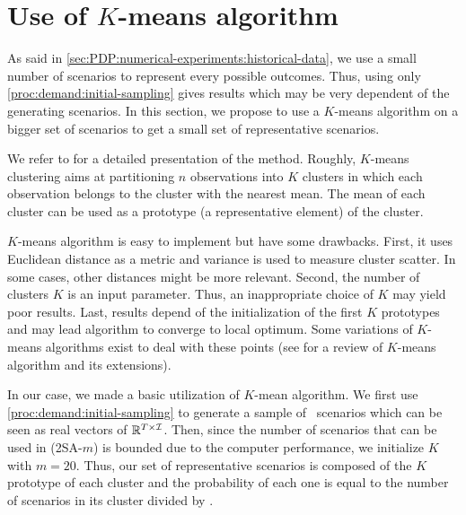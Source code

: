 


\section{Use of $K$-means algorithm}




As said in \cref{sec:PDP:numerical-experiments:historical-data}, we use a small number of scenarios to represent every possible outcomes.
Thus, using only \cref{proc:demand:initial-sampling} gives results which may be very dependent of the generating scenarios.
In this section, we propose to use a $K$-means algorithm on a bigger set of scenarios to get a small set of representative scenarios.




We refer to \cite{} for a detailed presentation of the method.
Roughly, $K$-means clustering aims at partitioning $n$ observations into $K$ clusters in which each observation belongs to the cluster with the nearest mean.
The mean of each cluster can be used as a prototype (\ie a representative element) of the cluster.


$K$-means algorithm is easy to implement but have some drawbacks.
First, it uses Euclidean distance as a metric and variance is used to measure cluster scatter.
In some cases, other distances might be more relevant.
Second, the number of clusters $K$ is an input parameter.
Thus, an inappropriate choice of $K$ may yield poor results.
Last, results depend of the initialization of the first $K$ prototypes and may lead algorithm to converge to local optimum.
Some variations of $K$-means algorithms exist to deal with these points (see \cite{Jain2010} for a review of $K$-means algorithm and its extensions).


\medskip

In our case, we made a basic utilization of $K$-mean algorithm.
We first use \cref{proc:demand:initial-sampling} to generate a sample of \tbc\ scenarios which can be seen as real vectors of $\mathbb{R}^{T\times\mathcal{I}}$.
Then, since the number of scenarios that can be used in (2SA-$m$) is bounded due to the computer performance, we initialize $K$ with $m=20$.
Thus, our set of representative scenarios is composed of the $K$ prototype of each cluster and the probability of each one is equal to the number of scenarios in its cluster divided by \tbc.



